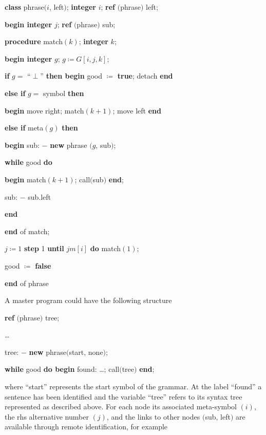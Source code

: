 \quad \textbf{class} phrase$(i$, left$)$; \textbf{integer} $i$; \textbf{ref} $($phrase$)$ left;

\quad \textbf{begin integer} $j$; \textbf{ref} $($phrase$)$ sub;

\quad \quad \textbf{procedure} match$(k)$; \textbf{integer} $k$;

\quad \quad \textbf{begin integer} $g$; $g\coloneq G[i,j, k]$;

\quad \quad \quad \textbf{if} $g =$ ``$\perp$'' \textbf{then begin} good $\coloneq$ \textbf{true}; detach \textbf{end}

\quad \quad \quad \textbf{else if} $g =$ symbol \textbf{then}

\quad \quad \quad \textbf{begin} move right; match$(k + 1)$; move left \textbf{end}

\quad \quad \quad \textbf{else if} meta$(g)$ \textbf{then}

\quad \quad \quad \textbf{begin} sub: $-$ \textbf{new} phrase $(g$, sub$)$;

\quad \quad \quad \quad \textbf{while} good \textbf{do}

\quad \quad \quad \quad \textbf{begin} match$(k + 1)$; call$($sub$)$ \textbf{end};

\quad \quad \quad \quad \quad sub: $-$ sub.left

\quad \quad \quad \quad \textbf{end}

\quad \quad \textbf{end} of match;

\quad \quad $j\coloneq 1$ \textbf{step} 1 \textbf{until} $jm[i]$ \textbf{do} match$(1);$

\quad \quad good $\coloneq$ \textbf{false}

\quad \textbf{end} of phrase

\noindent
A master program could have the following structure

\quad \textbf{ref} $($phrase$)$ tree;

\quad \dots

\quad tree: $-$ \textbf{new} phrase$($start, none$)$;

\quad \textbf{while} good \textbf{do begin} found: \dots; call$($tree$)$ \textbf{end};

\noindent
where ``start'' represents the start symbol of the grammar. At the label ``found'' a sentence has been identified and the variable ``tree'' refers to its syntax tree represented as described above. For each node its associated meta-symbol $(i)$, the rhs alternative number $(j)$, and the links to other nodes $($sub, left$)$ are available through remote identification, for example


